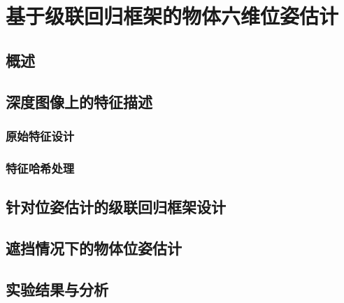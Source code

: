\chapter{基于级联回归框架的物体六维位姿估计}

\section{概述}

\section{深度图像上的特征描述}
\subsection{原始特征设计} %
\subsection{特征哈希处理} %

\section{针对位姿估计的级联回归框架设计}

\section{遮挡情况下的物体位姿估计} %

\section{实验结果与分析} %

